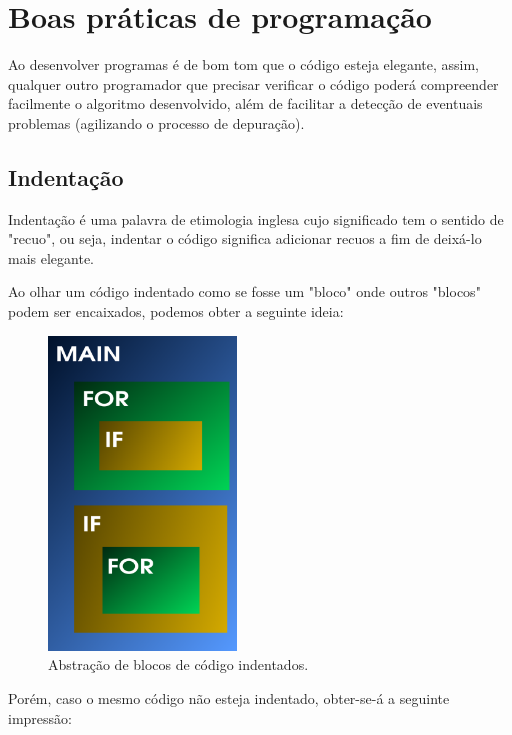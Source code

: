 \documentclass[12pt]{article}
\newcommand\tab[1][1cm]{\hspace*{#1}}
\begin{document}
\newpage

\section{Boas práticas de programação}

\par\tab Ao desenvolver programas é de bom tom que o código esteja elegante, assim, qualquer outro programador que precisar verificar o código poderá compreender facilmente o algoritmo desenvolvido, além de facilitar a detecção de eventuais problemas (agilizando o processo de depuração).

\subsection{Indentação}

\par\tab Indentação é uma palavra de etimologia inglesa cujo significado tem o sentido de "recuo", ou seja, indentar o código significa adicionar recuos a fim de deixá-lo mais elegante.\cite{presentation:pe_vet_func}

\par\tab Ao olhar um código indentado como se fosse um "bloco" onde outros "blocos" podem ser encaixados, podemos obter a seguinte ideia:

\begin{figure}[H]
    \centering
    \includegraphics[width=5cm, keepaspectratio]{indentation/Indendacao_1.png}
    \caption{Abstração de blocos de código indentados.}
    \label{fig:indentado}
\end{figure}

\par\tab Porém, caso o mesmo código não esteja indentado, obter-se-á a seguinte impressão:
\end{document}
